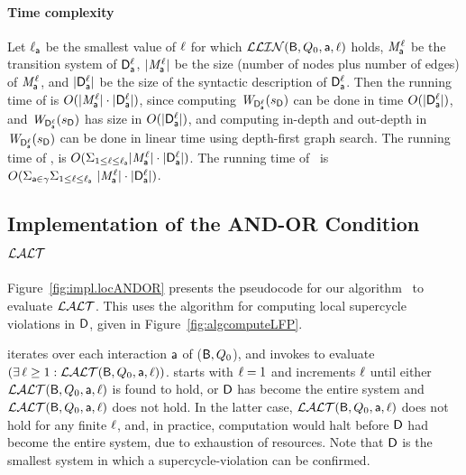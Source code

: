 \paragraph{Time complexity} 
Let 
$\l_\act$ be the smallest value of $\l$ for which $\LLin(\B, Q_0, \act, \l)$ holds, 
$\Mdsk{\act}{\l}$ be the transition system of $\dsks{\act}{\l}$, 
$|\Mdsk{\act}{\l}|$ be the size (number of nodes plus number of edges) of $\Mdsk{\act}{\l}$, and
$|\dsks{\act}{\l}|$ be the size of the syntactic description of $\dsks{\act}{\l}$.
%
Then the running  time of  is $O( |\Mdsk{\act}{\l}| \mult |\dsks{\act}{\l}|)$, since 
computing $\lwfg{\B}{\sD}{\dsks{\act}{\l}}$ can be done in time $O(|\dsks{\act}{\l}|)$, and 
$\lwfg{\B}{\sD}{\dsks{\act}{\l}}$ has size in $O(|\dsks{\act}{\l}|)$, and computing in-depth and out-depth in 
$\lwfg{\B}{\sD}{\dsks{\act}{\l}}$ can be done in linear time using depth-first graph search.
%
The running  time of , is $O( \SUM_{1 \le \l \le \l_\act}   |\Mdsk{\act}{\l}| \mult |\dsks{\act}{\l}|)$.
The running  time of \ is
$O(\SUM_{\act \in \gamma}    \SUM_{1 \le \l \le \l_\act}   \    |\Mdsk{\act}{\l}| \mult |\dsks{\act}{\l}|)$.



 
   \subsection{Implementation of the AND-OR Condition $\LAO$}
   \label{s:implANDOR}
%   


Figure~\ref{fig:impl.locANDOR} presents the pseudocode for our algorithm \ to evaluate $\LAO$.  This uses the 
\cLFP{$\dsk{\act}{\l},\sD$} algorithm for computing local supercycle violations in $\dsk{\act}{\l}$, given in Figure~\ref{fig:algcomputeLFP}.

 iterates over each interaction $\act$ of ($\B, Q_0$), and 
invokes  to evaluate $(\ex \l \ge 1: \LAO(\B, Q_0, \act, \l))$.
starts with $\l=1$ and increments $\l$ until either $\LAO(\B, Q_0, \act, \l)$ is found to hold, or
$\dsk{\act}{\l}$ has become the entire system and $\LAO(\B, Q_0, \act, \l)$ does not hold. In the
latter case, $\LAO(\B, Q_0, \act, \l)$ does not hold for any finite $\l$, and, in practice,
computation would halt before $\dsk{\act}{\l}$ had become the entire system, due to exhaustion of
resources.
Note that $\dsk{\act}{1}$ is the smallest system in which a
supercycle-violation can be confirmed. 

